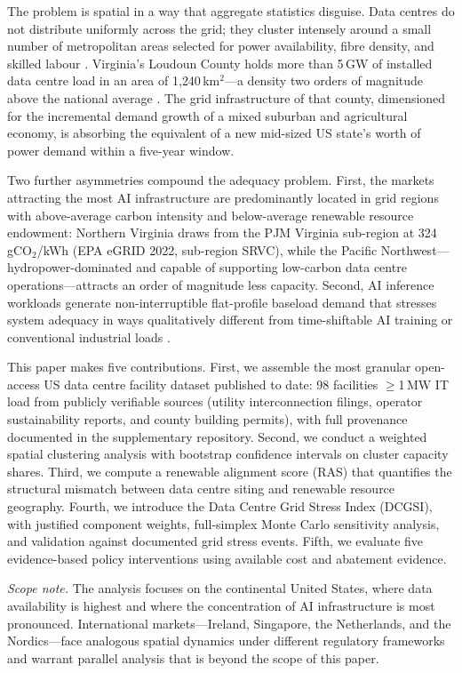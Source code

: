 \documentclass[preprint,12pt]{elsarticle}
\begin{document}
The problem is spatial in a way that aggregate statistics disguise.
Data centres do not distribute uniformly across the grid; they cluster
intensely around a small number of metropolitan areas selected for power
availability, fibre density, and skilled labour \cite{cbre2024h1}.
Virginia's Loudoun County holds more than 5\,GW of installed data centre
load in an area of 1{,}240\,km$^2$---a density two orders of magnitude
above the national average \cite{dominionirp2024}. The grid infrastructure
of that county, dimensioned for the incremental demand growth of a mixed
suburban and agricultural economy, is absorbing the equivalent of a new
mid-sized US state's worth of power demand within a five-year window.

Two further asymmetries compound the adequacy problem. First, the markets
attracting the most AI infrastructure are predominantly located in grid
regions with above-average carbon intensity and below-average renewable
resource endowment: Northern Virginia draws from the PJM Virginia
sub-region at 324\,gCO$_2$/kWh (EPA eGRID 2022, sub-region SRVC), while
the Pacific Northwest---hydropower-dominated and capable of supporting
low-carbon data centre operations---attracts an order of magnitude less
capacity. Second, AI inference workloads generate non-interruptible
flat-profile baseload demand that stresses system adequacy in ways
qualitatively different from time-shiftable AI training or conventional
industrial loads \cite{chien2023ai}.

This paper makes five contributions. First, we assemble the most granular
open-access US data centre facility dataset published to date: 98
facilities $\geq$1\,MW IT load from publicly verifiable sources (utility
interconnection filings, operator sustainability reports, and county
building permits), with full provenance documented in the supplementary
repository. Second, we conduct a weighted spatial clustering analysis with
bootstrap confidence intervals on cluster capacity shares. Third, we
compute a renewable alignment score (RAS) that quantifies the structural
mismatch between data centre siting and renewable resource geography.
Fourth, we introduce the Data Centre Grid Stress Index (DCGSI), with
justified component weights, full-simplex Monte Carlo sensitivity analysis,
and validation against documented grid stress events. Fifth, we evaluate
five evidence-based policy interventions using available cost and
abatement evidence.

\textit{Scope note.} The analysis focuses on the continental United States,
where data availability is highest and where the concentration of AI
infrastructure is most pronounced. International markets---Ireland,
Singapore, the Netherlands, and the Nordics---face analogous spatial
dynamics under different regulatory frameworks and warrant parallel
analysis that is beyond the scope of this paper.
\end{document}
